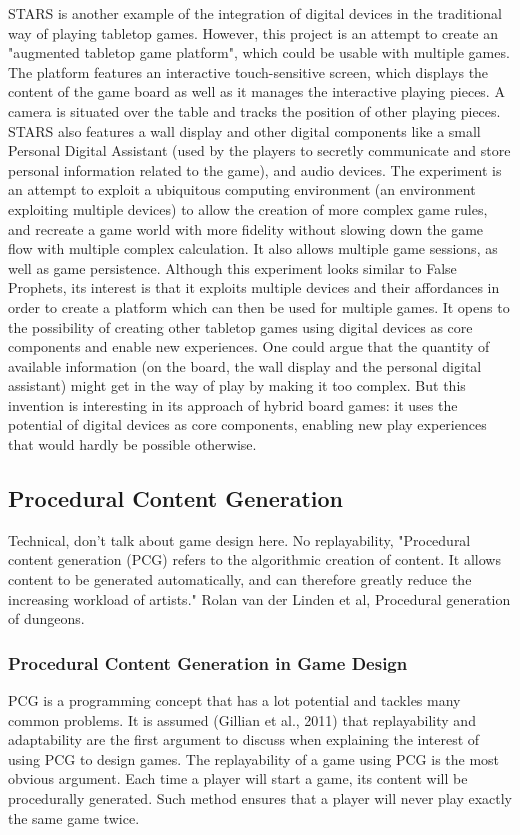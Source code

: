 STARS is another example of the integration of digital devices in the traditional way of playing tabletop games. However, this project is an attempt to create an "augmented tabletop game platform", which could be usable with multiple games. The platform features an interactive touch-sensitive screen, which displays the content of the game board as well as it manages the interactive playing pieces. A camera is situated over the table and tracks the position of other playing pieces. STARS also features a wall display and other digital components like a small Personal Digital Assistant (used by the players to secretly communicate and store personal information related to the game), and audio devices. The experiment is an attempt to exploit a ubiquitous computing environment (an environment exploiting multiple devices) to allow the creation of more complex game rules, and recreate a game world with more fidelity without slowing down the game flow with multiple complex calculation. It also allows multiple game sessions, as well as game persistence. Although this experiment looks similar to False Prophets, its interest is that it exploits multiple devices and their affordances in order to create a platform which can then be used for multiple games. It opens to the possibility of creating other tabletop games using digital devices as core components and enable new experiences. One could argue that the quantity of available information (on the board, the wall display and the personal digital assistant) might get in the way of play by making it too complex. But this invention is interesting in its approach of hybrid board games: it uses the potential of digital devices as core components, enabling new play experiences that would hardly be possible otherwise.
\subsection{Procedural Content Generation}
Technical, don't talk about game design here. No replayability, 
"Procedural content generation (PCG) refers to the algorithmic creation of content. It allows content to be generated automatically, and can therefore greatly reduce the increasing workload of artists." Rolan van der Linden et al, Procedural generation of dungeons.

\subsubsection{Procedural Content Generation in Game Design}

PCG is a programming concept that has a lot potential and tackles many common problems. It is assumed (Gillian et al., 2011) that replayability and adaptability are the first argument to discuss when explaining the interest of using PCG to design games. The replayability of a game using PCG is the most obvious argument. Each time a player will start a game, its content will be procedurally generated. Such method ensures that a player will never play exactly the same game twice. 
